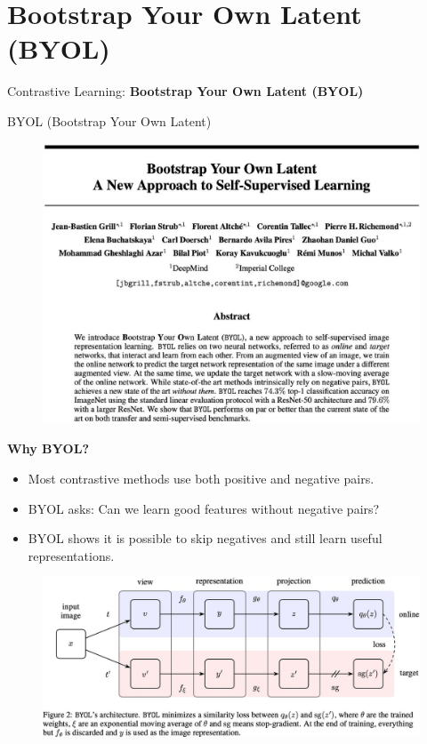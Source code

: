 \section{Bootstrap Your Own Latent (BYOL)}
\begin{frame}{}
    \LARGE Contrastive Learning: \textbf{Bootstrap Your Own Latent (BYOL)}
\end{frame}


\begin{frame}[allowframebreaks]{BYOL (Bootstrap Your Own Latent)}
\begin{figure}
    \centering
    \includegraphics[width=\linewidth,height=0.9\textheight,keepaspectratio]{images/contrastive/slide_80_1_img.jpg}
\end{figure}

\framebreak

\textbf{Why BYOL?}
\begin{itemize}
    \item Most contrastive methods use both positive and negative pairs.
    \item BYOL asks: Can we learn good features without negative pairs?
    \item BYOL shows it is possible to skip negatives and still learn useful representations.
\end{itemize}

\framebreak

\begin{figure}
    \centering
    \includegraphics[width=\linewidth,height=0.9\textheight,keepaspectratio]{images/contrastive/slide_81_1_img.jpg}
\end{figure}


\end{frame}
